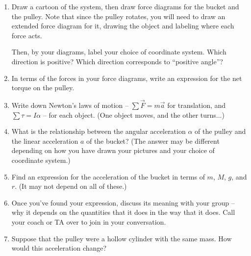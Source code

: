 \documentclass[12pt]{article}
\begin{document}
\begin{enumerate}

\item Draw a cartoon of the system, then draw force diagrams for the bucket and the pulley. Note that since the pulley rotates, you will need
to draw an extended force diagram for it, drawing the object and labeling where each force acts.

Then, by your diagrams, label your choice of coordinate system. Which direction is positive? Which direction corresponds to ``positive angle''?

\vspace{6in}

\item In terms of the forces in your force diagrams, write an expression for the net torque on the pulley.

\vspace{1in}
\newpage
\item Write down Newton's laws of motion -- $\sum \vec F = m \vec a$ for translation, and $\sum \tau = I \alpha$
-- for each object. (One object moves, and the other turns...)

\vspace{2in}



\item What is the relationship between the angular acceleration $\alpha$ of the pulley and the linear acceleration
$a$ of the bucket? (The answer may be different depending on how you have drawn your pictures and your choice of
coordinate system.)

\vspace{1in}

\item Find an expression for the acceleration of the bucket in terms of $m$, $M$, $g$, and $r$. (It may not depend on all of these.)

\vspace{4.5in}

\newpage

\item Once you've found your expression, discuss its meaning with your group -- why it depends on the quantities that it does in the way that it does. Call your coach or TA over to join in your conversation.

\vspace{2in}

\item Suppose that the pulley were a hollow cylinder with the same mass. How would this acceleration change?

\end{enumerate}


\end{document}
